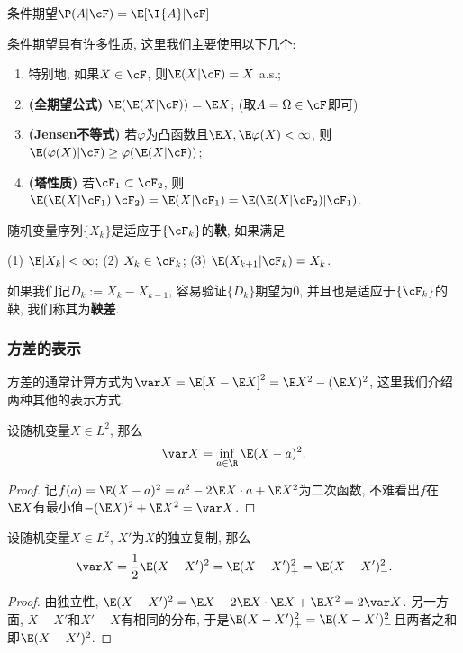 条件期望$\P(A | \cF) = \E[\I{A} | \cF]$

条件期望具有许多性质, 这里我们主要使用以下几个: 
	\begin{enumerate}[label=(\roman*)]
		\item 特别地, 如果$X \in \cF$, 则$\E(X|\cF) = X$ a.s.;
		\item \textbf{(全期望公式)} $\E(\E(X|\cF)) = \E X$; (取$A = \Omega \in \cF$即可)
		\item \textbf{(Jensen不等式)} 若$\varphi$为凸函数且$\E X, \E \varphi(X) < \infty$, 则$\E(\varphi(X) | \cF) \geq \varphi(\E(X|\cF))$; 
		\item \textbf{(塔性质)} 若$\cF_1 \subset \cF_2$, 则$\E(\E(X|\cF_1)|\cF_2) = \E(X|\cF_1) = \E(\E(X|\cF_2)|\cF_1)$. 
	\end{enumerate}
随机变量序列$\{X_k\}$是适应于$\{\cF_k\}$的\textbf{鞅}, 如果满足
\begin{center}
	(1) $\E |X_k| < \infty$; \quad
	(2) $X_k \in \cF_k$; \quad
	(3) $\E(X_{k+1}|\cF_k) = X_k$.
\end{center}
如果我们记$D_k := X_k - X_{k-1}$, 容易验证$\{D_k\}$期望为$0$, 并且也是适应于$\{\cF_k\}$的鞅, 我们称其为\textbf{鞅差}. 

\subsubsection{方差的表示}

方差的通常计算方式为$\var X = \E[X - \E X]^2 = \E X^2 - (\E X)^2$, 这里我们介绍两种其他的表示方式. 

\begin{lemma}[方差的变分表示]
	设随机变量$X \in L^2$, 那么
	\begin{equation*}
		\var X = \inf_{a \in \R} \E (X - a)^2. 
	\end{equation*}
\end{lemma}
\begin{proof}
	记$f(a) =  \E (X - a)^2 = a^2 - 2 \E X \cdot a + \E X^2$为二次函数, 不难看出$f$在$\E X$有最小值$- (\E X)^2 + \E X^2 = \var X$. 
\end{proof}

\begin{lemma}[独立复制]
	设随机变量$X \in L^2$, $X'$为$X$的独立复制, 那么
	\begin{equation*}
		\var X = \frac12 \E (X - X')^2
		= \E (X - X')_+^2 = \E (X - X')_-^2. 
	\end{equation*}
\end{lemma}
\begin{proof}
	由独立性, $\E (X - X')^2 = \E X - 2 \E X \cdot \E X + \E X^2 = 2 \var X$. 
	另一方面, $X - X'$和$X' - X$有相同的分布, 于是$\E(X - X')_+^2 = \E(X - X')_-^2$且两者之和即$\E (X - X')^2$. 
\end{proof}

